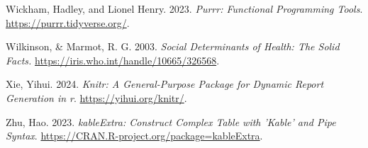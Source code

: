 \documentclass[
  letterpaper,
  DIV=11,
  numbers=noendperiod]{scrartcl}
\newlength{\cslhangindent}
\newenvironment{CSLReferences}[2] %
 {\begin{list}{}{%
  \setlength{\itemindent}{0pt}
  \setlength{\leftmargin}{0pt}
  \setlength{\parsep}{0pt}
  \ifodd #1
   \setlength{\leftmargin}{\cslhangindent}
   \setlength{\itemindent}{-1\cslhangindent}
  \fi
  \setlength{\itemsep}{#2\baselineskip}}}
 {\end{list}}
\begin{document}
\begin{CSLReferences}{1}{0}
Wickham, Hadley, and Lionel Henry. 2023. \emph{Purrr: Functional
Programming Tools}. \url{https://purrr.tidyverse.org/}.

Wilkinson, \& Marmot, R. G. 2003. \emph{Social Determinants of Health:
The Solid Facts.} \url{https://iris.who.int/handle/10665/326568}.

Xie, Yihui. 2024. \emph{Knitr: A General-Purpose Package for Dynamic
Report Generation in r}. \url{https://yihui.org/knitr/}.

Zhu, Hao. 2023. \emph{kableExtra: Construct Complex Table with 'Kable'
and Pipe Syntax}. \url{https://CRAN.R-project.org/package=kableExtra}.

\end{CSLReferences}
\end{document}
